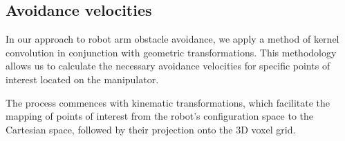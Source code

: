 \documentclass[a4paper]{article}
\newcommand\todocomment[1]{\textcolor{red}{||\\ #1\\||}}
\begin{document}

%
%



\subsection{Avoidance velocities}

In our approach to robot arm obstacle avoidance, we apply a method of kernel convolution in conjunction with geometric transformations. This methodology allows us to calculate the necessary avoidance velocities for specific points of interest located on the manipulator.

The process commences with kinematic transformations, which facilitate the mapping of points of interest from the robot's configuration space to the Cartesian space, followed by their projection onto the 3D voxel grid.
\end{document}
